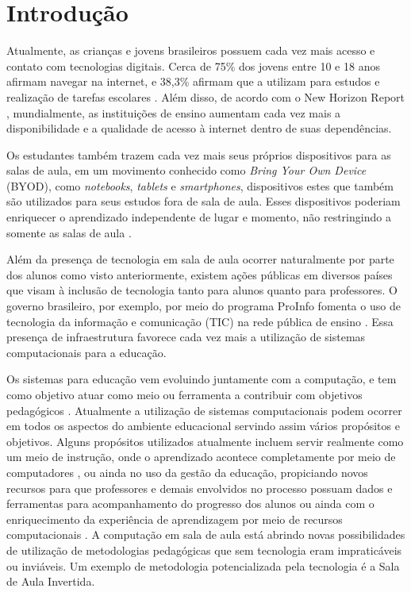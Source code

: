 \chapter{Introdução}
\label{cap:introducao}

Atualmente, as crianças e jovens brasileiros possuem cada vez mais acesso e contato
com tecnologias digitais. Cerca de 75\% dos jovens entre 10 e 18 anos afirmam navegar na internet, e 38,3\% afirmam que a utilizam para estudos e realização de tarefas escolares \cite{escola_futuro:2012}. Além disso, de acordo com o New Horizon Report \cite{horizon:2012}, mundialmente, as instituições de ensino aumentam cada vez mais a disponibilidade e a qualidade de acesso à internet dentro de suas dependências.

Os estudantes também trazem cada vez mais seus próprios dispositivos para as salas de aula, em um movimento conhecido como \emph{Bring Your Own Device} (BYOD), como \emph{notebooks}, \emph{tablets} e \emph{smartphones}, dispositivos estes que também são utilizados para seus estudos fora de sala de aula. Esses dispositivos poderiam enriquecer o aprendizado independente de lugar e momento, não restringindo a somente as salas de aula \cite{horizon_k12:2014}. 



Além da presença de tecnologia em sala de aula ocorrer naturalmente por parte dos alunos como visto anteriormente, existem ações públicas em diversos países que visam à inclusão de tecnologia tanto para alunos quanto para professores. O governo brasileiro, por exemplo, por meio do programa ProInfo fomenta o uso de tecnologia da informação e comunicação (TIC) na rede pública de ensino \cite{proinfo}. Essa presença de infraestrutura favorece cada vez mais a utilização de sistemas computacionais para a educação.

Os sistemas para educação vem evoluindo juntamente com a computação, e tem como objetivo atuar como meio ou ferramenta a contribuir com objetivos pedagógicos \cite{tchounikine11}. Atualmente a utilização de sistemas computacionais podem ocorrer em todos os aspectos do ambiente educacional servindo assim vários propósitos e objetivos. Alguns propósitos utilizados atualmente incluem servir realmente como um meio de instrução, onde o aprendizado acontece completamente por meio de computadores \cite{mlearning09}, ou ainda no uso da gestão da educação, propiciando novos recursos para que professores e demais envolvidos no processo possuam dados e ferramentas para acompanhamento do progresso dos alunos \cite{flescher02} ou ainda com o enriquecimento da experiência de aprendizagem por meio de recursos computacionais \cite{cotton91}. A computação em sala de aula está abrindo novas possibilidades de utilização de metodologias pedagógicas que sem tecnologia eram impraticáveis ou inviáveis. Um exemplo de metodologia potencializada pela tecnologia é a Sala de Aula Invertida. 

